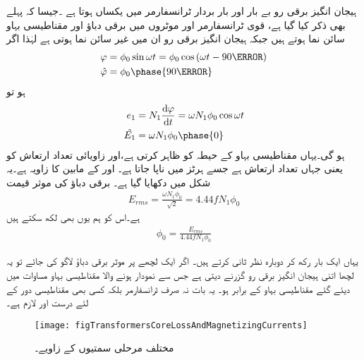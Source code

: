 ہیجان انگیز برقی رو بے بار اور بار بردار ٹرانسفارمر میں یکساں ہوتا ہے ۔جیسا کہ پہلے بھی ذکر کیا گیا ہے، قوی ٹرانسفارمر اور موٹروں میں برقی دباؤ اور مقناطیسی بہاو سائن نما ہوتے ہیں جبکہ ہیجان انگیز برقی رو ان میں غیر سائن نما ہوتی ہے لہٰذا اگر
\begin{gather}
\begin{aligned}
\varphi&=\phi_0 \sin \omega t=\phi_0 \cos \left(\omega t -90\degree \right)\\
\hat{\varphi}&=\phi_0 \phase{90\degree}
\end{aligned}
\end{gather}
ہو تو
\begin{gather}
\begin{aligned}\label{مساوات_ٹڑانسفارمر_دباؤ_سمتیہ}
e_1&=N_1 \frac{\dif \varphi}{\dif t}=\omega N_1 \phi_0 \cos \omega t\\
\hat{E_1}&=\omega N_1 \phi_0 \phase{0}
\end{aligned}
\end{gather}
ہو گی۔یہاں  مقناطیسی بہاو کے حیطہ کو ظاہر کرتی ہے،اور  زاویائی تعداد ارتعاش کو یعنی  جہاں  تعداد ارتعاش ہے جسے ہرٹز  میں ناپا جاتا ہے۔ اور  کے مابین  کا زاویہ ہے۔یہ شکل  میں دکھایا گیا ہے۔ برقی دباؤ  کی موثر قیمت   
\begin{align}
E_{rms}=\frac{\omega N_1 \phi_0}{\sqrt{2}}=4.44 f N_1 \phi_0
\end{align}
ہے۔اس کو ہم یوں بھی لکھ سکتے ہیں
\begin{align}\label{مساوات_ٹرانسفارمر_درکار_ہیجان_بہاو}
\phi_0=\frac{E_{rms}}{4.44 f N_1 \phi_0}
\end{align}

یہاں ایک بار رکھ کر دوبارہ نظر ثانی کرتے ہیں۔ اگر ایک  لچھے پر  موثر برقی دباؤ لاگو کی جائے تو یہ لچھا اتنی ہیجان انگیز برقی رو  گزرنے دیتی ہے جس سے نمودار ہونے والا مقناطیسی بہاو مساوات   میں دیئے گئے مقناطیسی بہاو  کے برابر ہو۔ یہ بات نہ صرف ٹرانسفارمر بلکہ کسی بھی مقناطیسی دور کے لئے درست اور لازم ہے۔
\begin{figure}
\centering
\texttt{[image: figTransformersCoreLossAndMagnetizingCurrents]}
\caption{مختلف مرحلی سمتیوں کے زاویے۔}
\label{شکل_ٹرانسفارمر_مرکزی_ضیاع_اور_مقناطیسی_رو}
\end{figure}

